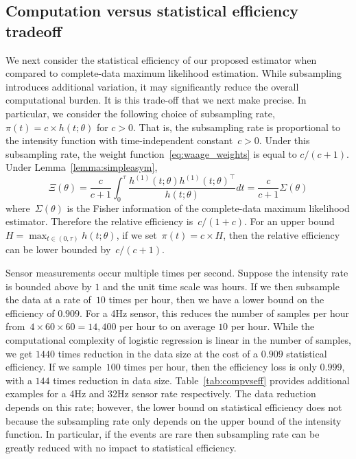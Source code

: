 \documentclass[12pt]{amsart}
\begin{document}
\subsection{Computation versus statistical efficiency tradeoff}
\label{section:tradeoff}

We next consider the statistical efficiency of our proposed estimator when compared to complete-data maximum likelihood estimation. While subsampling introduces additional variation, it may significantly reduce the overall computational burden. It is this trade-off that we next make precise. In particular, we consider the following choice of subsampling rate,~$\pi(t) = c \times h(t; \theta)$ for $c>0$. That is, the subsampling rate is proportional to the intensity function with time-independent constant~$c > 0$. Under this subsampling rate, the weight function~\eqref{eq:waage_weights} is equal to $c/ (c+1)$. Under Lemma~\ref{lemma:simpleasym},
\[
\Xi (\theta) = \frac{c}{c+1} \int_0^\tau \frac{ h^{(1)} (t; \theta)
  h^{(1)} (t; \theta)^\top}{h (t; \theta)} dt = \frac{c}{c+1} \Sigma (\theta)
\]
where~$\Sigma(\theta)$ is the Fisher information of the complete-data maximum likelihood estimator.
Therefore the relative efficiency is~$c/(1+c)$. For an upper bound~$H = \max_{t \in (0,\tau)} h(t;\theta)$, if we set~$\pi (t) = c \times H$, then the relative efficiency can be lower bounded by~$c / (c+1)$.

Sensor measurements occur multiple times per second.  Suppose the intensity rate is bounded above by $1$ and the unit time scale was hours. If we then  subsample the data at a rate of~$10$ times per hour, then we have a lower bound on the efficiency of $0.909$. For a 4Hz sensor, this reduces the number of samples per hour from~$4 \times 60 \times 60 = 14,400$ per hour to on average $10$ per hour. While the computational complexity of logistic regression is linear in the number of samples, we get $1440$ times reduction in the data size at the cost of a $0.909$ statistical efficiency. If we sample~$100$ times per hour, then the efficiency loss is only $0.999$, with a $144$ times reduction in data size. Table~\ref{tab:compvseff} provides additional examples for a 4Hz and 32Hz sensor rate respectively.  The data reduction depends on this rate; however, the lower bound on statistical efficiency does not because the subsampling rate only depends on the upper bound of the intensity function. In particular, if the events are rare then subsampling rate can be greatly reduced with no impact to statistical efficiency.
\end{document}
